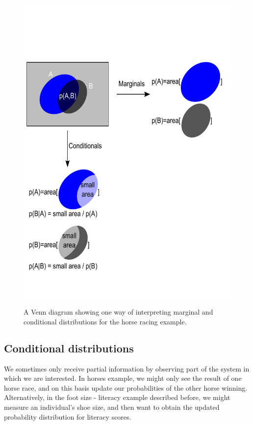 \documentclass[11pt,fullpage]{book}
\begin{document}
\begin{figure}
\centering
\scalebox{0.5} 
{\includegraphics{Probability_Venn.pdf}}
\caption{A Venn diagram showing one way of interpreting marginal and conditional distributions for the horse racing example.}\label{fig:Probability_Venn}
\end{figure}

\subsection{Conditional distributions}\label{sec:Probability_conditionalDistributionIntro}
We sometimes only receive partial information by observing part of the system in which we are interested. In horses example, we might only see the result of one horse race, and on this basis update our probabilities of the other horse winning. Alternatively, in the foot size - literacy example described before, we might measure an individual's shoe size, and then want to obtain the updated probability distribution for literacy scores.
\end{document}
